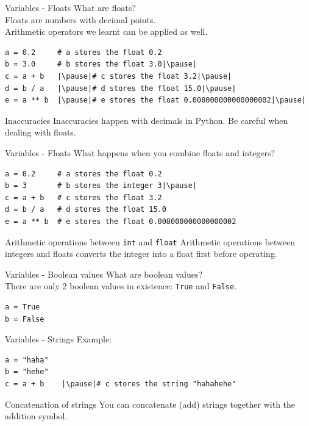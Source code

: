 \documentclass[dvipsnames, svgnames, x11names, handout]{beamer}
\begin{document}
\begin{frame}[fragile]{Variables - Floats}
What are floats?\pause\\
Floats are numbers with decimal points.\pause\\
Arithmetic operators we learnt can be applied as well.
\begin{verbatim}
a = 0.2     # a stores the float 0.2
b = 3.0     # b stores the float 3.0|\pause|
c = a + b   |\pause|# c stores the float 3.2|\pause|
d = b / a   |\pause|# d stores the float 15.0|\pause|
e = a ** b  |\pause|# e stores the float 0.008000000000000002|\pause|
\end{verbatim}
\begin{alertblock}{Inaccuracies}
Inaccuracies happen with decimals in Python. Be careful when dealing with floats.
\end{alertblock}
\end{frame}

\begin{frame}[fragile]{Variables - Floats}
What happens when you combine floats and integers? \pause
\begin{verbatim}
a = 0.2     # a stores the float 0.2
b = 3       # b stores the integer 3|\pause|
c = a + b   # c stores the float 3.2
d = b / a   # d stores the float 15.0
e = a ** b  # e stores the float 0.008000000000000002
\end{verbatim}
\pause
\begin{block}{Arithmetic operations between \texttt{int} and \texttt{float}}
Arithmetic operations between integers and floats converts the integer into a float first before operating.
\end{block}
\end{frame}

\begin{frame}[fragile]{Variables - Boolean values}
What are boolean values?\pause\\
There are only 2 boolean values in existence: \texttt{True} and \texttt{False}.\pause
\begin{verbatim}
a = True
b = False
\end{verbatim}
\end{frame}

\begin{frame}[fragile]{Variables - Strings}
Example:
\begin{verbatim}
a = "haha"
b = "hehe"
c = a + b    |\pause|# c stores the string "hahahehe"
\end{verbatim}
\pause
\begin{block}{Concatenation of strings}
You can concatenate (add) strings together with the addition symbol.
\end{block}
\end{frame}
\end{document}
